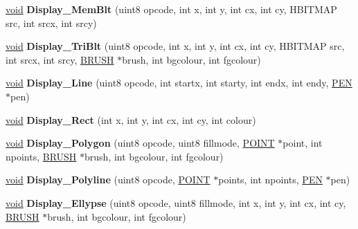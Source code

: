 \begin{DoxyCompactItemize}
\item 
\mbox{\label{class_rdp_client_u_i_ad16113c1b517c9ee2dec835ca3e565f2}} 
\hyperlink{interfacevoid}{void} {\bfseries Display\+\_\+\+Mem\+Blt} (uint8 opcode, int x, int y, int cx, int cy, H\+B\+I\+T\+M\+AP src, int srcx, int srcy)
\item 
\mbox{\label{class_rdp_client_u_i_ab498ef1c61b1e40fd32da5b600e5d6dc}} 
\hyperlink{interfacevoid}{void} {\bfseries Display\+\_\+\+Tri\+Blt} (uint8 opcode, int x, int y, int cx, int cy, H\+B\+I\+T\+M\+AP src, int srcx, int srcy, \hyperlink{class_b_r_u_s_h}{B\+R\+U\+SH} $\ast$brush, int bgcolour, int fgcolour)
\item 
\mbox{\label{class_rdp_client_u_i_a84f32977ccc3efc59faeccbd339e0e77}} 
\hyperlink{interfacevoid}{void} {\bfseries Display\+\_\+\+Line} (uint8 opcode, int startx, int starty, int endx, int endy, \hyperlink{struct___p_e_n}{P\+EN} $\ast$pen)
\item 
\mbox{\label{class_rdp_client_u_i_a3306625c119763c7b927d06f519b5ad6}} 
\hyperlink{interfacevoid}{void} {\bfseries Display\+\_\+\+Rect} (int x, int y, int cx, int cy, int colour)
\item 
\mbox{\label{class_rdp_client_u_i_aedea2a6e4d9efecee4faf047fb84154e}} 
\hyperlink{interfacevoid}{void} {\bfseries Display\+\_\+\+Polygon} (uint8 opcode, uint8 fillmode, \hyperlink{structtag_p_o_i_n_t}{P\+O\+I\+NT} $\ast$point, int npoints, \hyperlink{class_b_r_u_s_h}{B\+R\+U\+SH} $\ast$brush, int bgcolour, int fgcolour)
\item 
\mbox{\label{class_rdp_client_u_i_abeeadb0bef9d8f7215e6669c68c1598a}} 
\hyperlink{interfacevoid}{void} {\bfseries Display\+\_\+\+Polyline} (uint8 opcode, \hyperlink{structtag_p_o_i_n_t}{P\+O\+I\+NT} $\ast$points, int npoints, \hyperlink{struct___p_e_n}{P\+EN} $\ast$pen)
\item 
\mbox{\label{class_rdp_client_u_i_add90482607b0cf10b5a629276467d7bf}} 
\hyperlink{interfacevoid}{void} {\bfseries Display\+\_\+\+Ellypse} (uint8 opcode, uint8 fillmode, int x, int y, int cx, int cy, \hyperlink{class_b_r_u_s_h}{B\+R\+U\+SH} $\ast$brush, int bgcolour, int fgcolour)

\end{DoxyCompactItemize}
